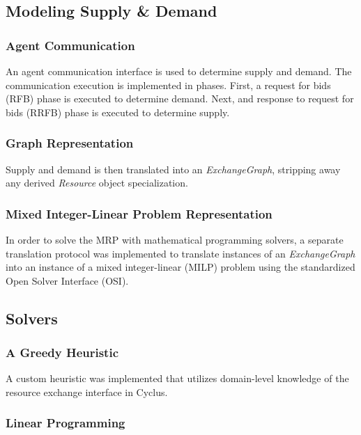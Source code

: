 \subsection{Modeling Supply \& Demand}

\subsubsection{Agent Communication}

An agent communication interface is used to determine supply and demand. The
communication execution is implemented in phases. First, a request for bids
(RFB) phase is executed to determine demand. Next, and response to request for
bids (RRFB) phase is executed to determine supply.


\subsubsection{Graph Representation}

Supply and demand is then translated into an \textit{ExchangeGraph}, stripping
away any derived \textit{Resource} object specialization. 


\subsubsection{Mixed Integer-Linear Problem Representation}

In order to solve the MRP with mathematical programming solvers, a separate
translation protocol was implemented to translate instances of an
\textit{ExchangeGraph} into an instance of a mixed integer-linear (MILP) problem
using the standardized Open Solver Interface (OSI). %

\subsection{Solvers}

\subsubsection{A Greedy Heuristic}

A custom heuristic was implemented that utilizes domain-level knowledge of the
resource exchange interface in Cyclus.

\subsubsection{Linear Programming}

